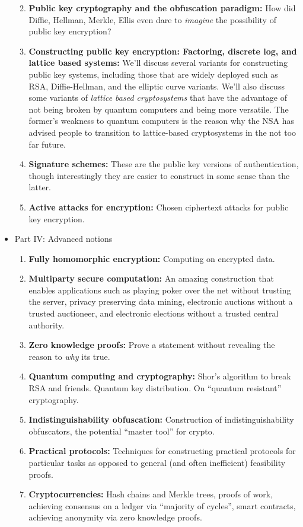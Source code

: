 \begin{itemize}
  \begin{enumerate}
  \def\labelenumi{\arabic{enumi}.}
  \item
    \textbf{Public key cryptography and the obfuscation paradigm:} How
    did Diffie, Hellman, Merkle, Ellis even dare to \emph{imagine} the
    possibility of public key encryption?
  \item
    \textbf{Constructing public key encryption: Factoring, discrete log,
    and lattice based systems:} We'll discuss several variants for
    constructing public key systems, including those that are widely
    deployed such as RSA, Diffie-Hellman, and the elliptic curve
    variants. We'll also discuss some variants of \emph{lattice based
    cryptosystems} that have the advantage of not being broken by
    quantum computers and being more versatile. The former's weakness to
    quantum computers is the reason why the NSA has advised people to
    transition to lattice-based cryptosystems in the not too far future.
  \item
    \textbf{Signature schemes:} These are the public key versions of
    authentication, though interestingly they are easier to construct in
    some sense than the latter.
  \item
    \textbf{Active attacks for encryption:} Chosen ciphertext attacks
    for public key encryption.
  \end{enumerate}
\item
  Part IV: Advanced notions

  \begin{enumerate}
  \def\labelenumi{\arabic{enumi}.}
  \item
    \textbf{Fully homomorphic encryption:} Computing on encrypted data.
  \item
    \textbf{Multiparty secure computation:} An amazing construction that
    enables applications such as playing poker over the net without
    trusting the server, privacy preserving data mining, electronic
    auctions without a trusted auctioneer, and electronic elections
    without a trusted central authority.
  \item
    \textbf{Zero knowledge proofs:} Prove a statement without revealing
    the reason to \emph{why} its true.
  \item
    \textbf{Quantum computing and cryptography:} Shor's algorithm to
    break RSA and friends. Quantum key distribution. On ``quantum
    resistant'' cryptography.
  \item
    \textbf{Indistinguishability obfuscation:} Construction of
    indistinguishability obfuscators, the potential ``master tool'' for
    crypto.
  \item
    \textbf{Practical protocols:} Techniques for constructing practical
    protocols for particular tasks as opposed to general (and often
    inefficient) feasibility proofs.
  \item
    \textbf{Cryptocurrencies:} Hash chains and Merkle trees, proofs of
    work, achieving consensus on a ledger via ``majority of cycles'',
    smart contracts, achieving anonymity via zero knowledge proofs.
  \end{enumerate}
\end{itemize}

